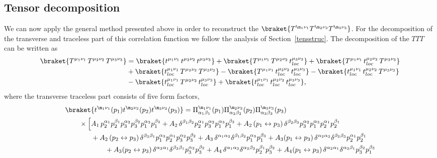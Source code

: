 \documentclass[a4paper,11pt,openright,twoside]{book}
\let\a=\alpha   \let\b=\beta   \let\g=\gamma   \let\d=\delta
\let\n=\nu      \let\x=\xi     \let\p=\pi      \let\r=\rho
\newcommand{\secref}[1]{Section~\ref{#1}}		%
\numberwithin{equation}{section}
\begin{document}
{{{\subsection{Tensor decomposition}
We can now apply the general method presented above in order to reconstruct the $\braket{T^{\m_1\n_1}T^{\m_2\n_2}T^{\m_3\n_3}}$. For the decomposition of the transverse and traceless part of this correlation function we follow the analysis of \secref{tensstruc}. The decomposition of the $TTT$ can be written as
\begin{align}
	\braket{T^{\mu_1\nu_1}\,T^{\mu_2\n_2}\,T^{\mu_3\n_3}}&=\braket{t^{\mu_1\nu_1}\,t^{\mu_2\n_2}\,t^{\mu_3\n_3}}+\braket{T^{\mu_1\nu_1}\,T^{\mu_2\n_2}\,t_{loc}^{\mu_3\n_3}}+\braket{T^{\mu_1\nu_1}\,t_{loc}^{\mu_2\n_2}\,T^{\mu_3\n_3}}\notag\\
	&+\braket{t_{loc}^{\mu_1\nu_1}\,T^{\mu_2\n_2}\,T^{\mu_3\n_3}}-\braket{T^{\mu_1\nu_1}\,t_{loc}^{\mu_2\n_2}\,t_{loc}^{\mu_3\n_3}}-\braket{t_{loc}^{\mu_1\nu_1}\,t_{loc}^{\mu_2\n_2}\,T^{\mu_3\n_3}}\notag\\
	&-\braket{t_{loc}^{\mu_1\nu_1}\,T^{\mu_2\n_2}\,t_{loc}^{\mu_3\n_3}}+\braket{t_{loc}^{\mu_1\nu_1}\,t_{loc}^{\mu_2\n_2}\,t_{loc}^{\mu_3\n_3}},\label{reconstrTTT}
\end{align}
where the transverse traceless part consists of five form factors,
\begin{align}
	&\braket{t^{\m_1\n_1}(p_1)t^{\m_2\n_2}(p_2)t^{\m_3\n_3}(p_3)}
	= \Pi^{\m_1\n_1}_{\a_1\b_1}(p_1)
	\Pi^{\m_2\n_2}_{\a_2\b_2}(p_2)\Pi^{\m_3\n_3}_{\a_3\b_3}(p_3)\notag\\
	&\hspace{0.7cm}\times\Big[ A_1\,p_2^{\a_1} p_2^{\b_1} p_3^{\a_2} p_3^{\b_2} p_1^{\a_3} p_1^{\b_3}+ A_2\,\d^{\b_1\b_2} p_2^{\a_1} p_3^{\a_2} p_1^{\a_3} p_1^{\b_3} 
	+ A_2\,(p_1 \leftrightarrow p_3)\, \d^{\b_2\b_3}  p_3^{\a_2} p_1^{\a_3} p_2^{\a_1} p_2^{\b_1} \notag\\
	&\hspace{1.3cm}+ A_2\,(p_2\leftrightarrow p_3)\, \d^{\b_3\b_1} p_1^{\a_3} p_2^{\a_1}  p_3^{\a_2} p_3^{\b_2}+ A_3\,\d^{\a_1\a_2} \d^{\b_1\b_2}  p_1^{\a_3} p_1^{\b_3} + A_3(p_1\leftrightarrow p_3)\,\d^{\a_2\a_3} \d^{\b_2\b_3}  p_2^{\a_1} p_2^{\b_1} \notag\\
	&\hspace{2cm}
	+ A_3(p_2\leftrightarrow p_3)\,\d^{\a_3\a_1} \d^{\b_3\b_1}  p_3^{\a_2} p_3^{\b_2} + A_4\,\d^{\a_1\a_3} \d^{\a_2\b_3}  p_2^{\b_1} p_3^{\b_2} + A_4(p_1\leftrightarrow p_3)\, \d^{\a_2\a_1} \d^{\a_3\b_1}  p_3^{\b_2} p_1^{\b_3} \notag\\

\end{align}}}}
\end{document}
